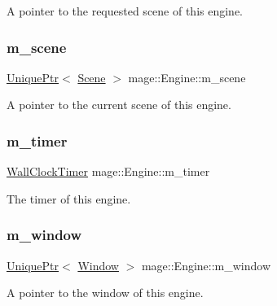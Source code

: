 A pointer to the requested scene of this engine. \hypertarget{classmage_1_1_engine_a2d4037208a0529838c81ccea08c9de11}{}\label{classmage_1_1_engine_a2d4037208a0529838c81ccea08c9de11} 
\subsubsection{\texorpdfstring{m\+\_\+scene}{m\_scene}}
{\footnotesize\ttfamily \hyperlink{namespacemage_a3316d7143a973e37adf1110f2e80ca31}{Unique\+Ptr}$<$ \hyperlink{classmage_1_1_scene}{Scene} $>$ mage\+::\+Engine\+::m\+\_\+scene\hspace{0.3cm}{\ttfamily [private]}}

A pointer to the current scene of this engine. \hypertarget{classmage_1_1_engine_a539cff5bf8252ef28b994be49e9e6b7c}{}\label{classmage_1_1_engine_a539cff5bf8252ef28b994be49e9e6b7c} 
\subsubsection{\texorpdfstring{m\+\_\+timer}{m\_timer}}
{\footnotesize\ttfamily \hyperlink{namespacemage_a06f4035ef59f07892e594bf1178a108a}{Wall\+Clock\+Timer} mage\+::\+Engine\+::m\+\_\+timer\hspace{0.3cm}{\ttfamily [private]}}

The timer of this engine. \hypertarget{classmage_1_1_engine_a8b710b9c37a48caad05896102c4b6980}{}\label{classmage_1_1_engine_a8b710b9c37a48caad05896102c4b6980} 
\subsubsection{\texorpdfstring{m\+\_\+window}{m\_window}}
{\footnotesize\ttfamily \hyperlink{namespacemage_a3316d7143a973e37adf1110f2e80ca31}{Unique\+Ptr}$<$ \hyperlink{classmage_1_1_window}{Window} $>$ mage\+::\+Engine\+::m\+\_\+window\hspace{0.3cm}{\ttfamily [private]}}

A pointer to the window of this engine. 